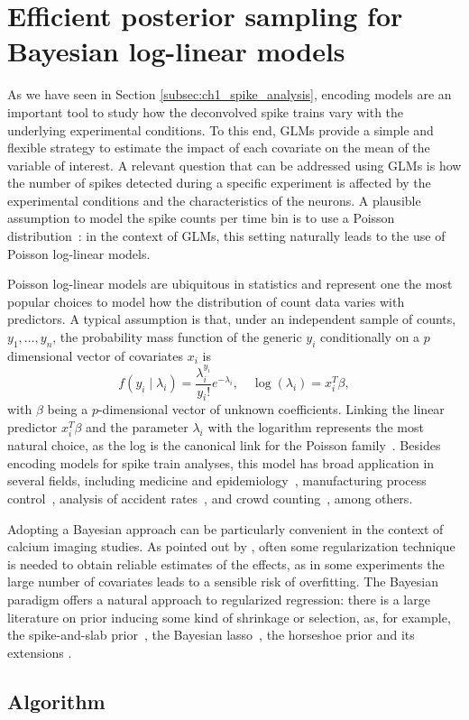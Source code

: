 \chapter{Efficient posterior sampling for Bayesian log-linear models}



As we have seen in Section \ref{subsec:ch1_spike_analysis}, encoding models are an important tool to study how the deconvolved spike trains vary with the underlying experimental conditions. To this end, GLMs provide a simple and flexible strategy to estimate the impact of each covariate on the mean of the variable of interest.
A relevant question that can be addressed using GLMs is how the number of spikes detected during a specific experiment is affected by the experimental conditions and the characteristics of the neurons. A plausible assumption to model the spike counts per time bin is to use a Poisson distribution~\citep{paninski2007}: in the context of GLMs, this setting naturally leads to the use of Poisson log-linear models. 

Poisson log-linear models are ubiquitous in statistics and represent one the most popular choices to model how the distribution of count data varies with predictors. A typical assumption is that, under an independent sample of counts, $y_1, \dots, y_n$, the probability mass function of the generic $y_i$ conditionally on a $p$ dimensional vector of covariates $x_i$ is
\begin{equation*}
f(y_i \mid \lambda_i) =  \frac {\lambda_i^{y_i}}{{y_i}!}e^{-\lambda_i}, \quad \log(\lambda_i) = x_i^T \beta,
\label{eq:model0}
\end{equation*}
with $\beta$ being a $p$-dimensional vector of unknown coefficients. Linking the linear predictor $x_i^T \beta$ and the parameter $\lambda_i$ with the logarithm represents the most natural choice, as the log is the canonical link for the Poisson family~\citep{nelder1972glm}.
Besides encoding models for spike train analyses, this model has broad application in several fields, including medicine and epidemiology~\citep{Frome1983, frome1985, Hutchinson2005}, manufacturing process control~\citep{lambert1992}, analysis of accident rates~\citep{Sarath1990, Miaou1994}, and crowd counting~\citep{chan2009}, among others.

Adopting a Bayesian approach can be particularly convenient in the context of calcium imaging studies. As pointed out by \citet{paninski2007}, often some regularization technique is needed to obtain reliable estimates of the effects, as in some experiments the large number of covariates leads to a sensible risk of overfitting.
The Bayesian paradigm offers a natural approach to regularized regression: there is a large literature on prior inducing some kind of shrinkage or selection, as, for example, the spike-and-slab prior~\citep{mitchell1988}, the Bayesian lasso~\citep{park2008bayesian}, the horseshoe prior and its extensions \citep{carvalho2010horseshoe,Piironen2017}.


\section{Algorithm} 
\noindent

